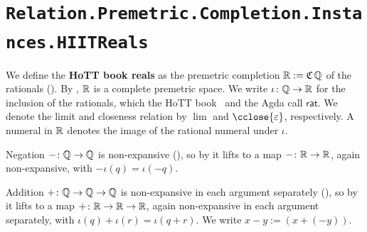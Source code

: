 \section{\texttt{Relation.Premetric.Completion.Instances.HIITReals}}

\begin{definition}
  \label{reals}
  We define the \textbf{HoTT book reals} as the premetric completion $\mathbb{R} := \mathfrak{C}\,\mathbb{Q}$ of the rationals (). By , $\mathbb{R}$ is a complete premetric space. We write $\iota \colon \mathbb{Q} \to \mathbb{R}$ for the inclusion of the rationals, which the HoTT book~\cite{univalentfoundationsprogram2013} and the Agda call $\mathsf{rat}$. We denote the limit and closeness relation by $\lim$ and $\cclose{\varepsilon}$, respectively. A numeral in $\mathbb{R}$ denotes the image of the rational numeral under $\iota$.
\end{definition}

\begin{definition}
  \label{negNReal}
  Negation $- \colon \mathbb{Q} \to \mathbb{Q}$ is non-expansive (), so by  it lifts to a map $- \colon \mathbb{R} \to \mathbb{R}$, again non-expansive, with $-\iota(q) = \iota(-q)$.
\end{definition}

\begin{definition}
  \label{plusNReal}
  Addition $+ \colon \mathbb{Q} \to \mathbb{Q} \to \mathbb{Q}$ is non-expansive in each argument separately (), so by  it lifts to a map $+ \colon \mathbb{R} \to \mathbb{R} \to \mathbb{R}$, again non-expansive in each argument separately, with $\iota(q) + \iota(r) = \iota(q + r)$. We write $x - y := (x + (-y))$.
\end{definition}
